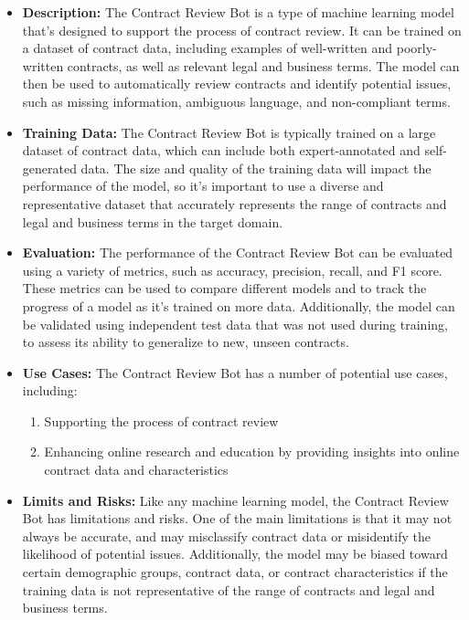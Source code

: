 \begin{itemize}
    \item \textbf{Description:} The Contract Review Bot is a type of machine learning model that's designed to support the process of contract review. It can be trained on a dataset of contract data, including examples of well-written and poorly-written contracts, as well as relevant legal and business terms. The model can then be used to automatically review contracts and identify potential issues, such as missing information, ambiguous language, and non-compliant terms.
    \item \textbf{Training Data:} The Contract Review Bot is typically trained on a large dataset of contract data, which can include both expert-annotated and self-generated data. The size and quality of the training data will impact the performance of the model, so it's important to use a diverse and representative dataset that accurately represents the range of contracts and legal and business terms in the target domain.
    \item \textbf{Evaluation:} The performance of the Contract Review Bot can be evaluated using a variety of metrics, such as accuracy, precision, recall, and F1 score. These metrics can be used to compare different models and to track the progress of a model as it's trained on more data. Additionally, the model can be validated using independent test data that was not used during training, to assess its ability to generalize to new, unseen contracts.
    \item \textbf{Use Cases:} The Contract Review Bot has a number of potential use cases, including:
        \begin{enumerate}  
            \item Supporting the process of contract review
            \item Enhancing online research and education by providing insights into online contract data and characteristics
        \end{enumerate}
    \item \textbf{Limits and Risks:} Like any machine learning model, the Contract Review Bot has limitations and risks. One of the main limitations is that it may not always be accurate, and may misclassify contract data or misidentify the likelihood of potential issues. Additionally, the model may be biased toward certain demographic groups, contract data, or contract characteristics if the training data is not representative of the range of contracts and legal and business terms.

\end{itemize}
